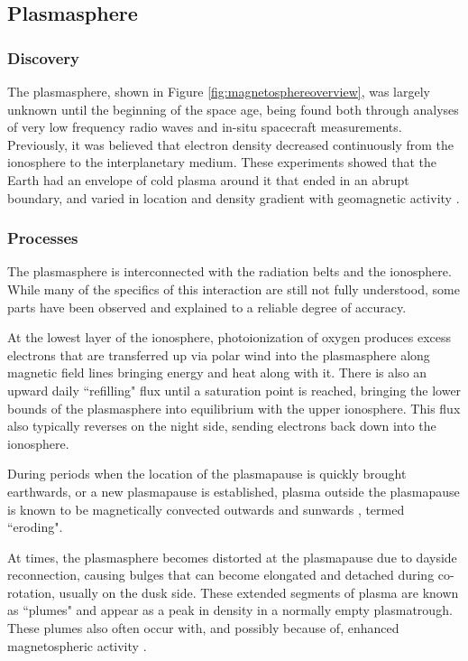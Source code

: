 \subsection{Plasmasphere}

\subsubsection{Discovery}
The plasmasphere, shown in Figure \ref{fig:magnetosphereoverview}, was largely unknown until the beginning of the space age, being found both through analyses of very low frequency radio waves and in-situ spacecraft measurements. Previously, it was believed that electron density decreased continuously from the ionosphere to the interplanetary medium. These experiments showed that the Earth had an envelope of cold plasma around it that ended in an abrupt boundary, and varied in location and density gradient with geomagnetic activity \citep{Carpenter1966WhistlerStudiesPlasmapause,EarthsPlasmasphere}.

\subsubsection{Processes}
The plasmasphere is interconnected with the radiation belts and the ionosphere. While many of the specifics of this interaction are still not fully understood, some parts have been observed and explained to a reliable degree of accuracy. 

At the lowest layer of the ionosphere, photoionization of oxygen produces excess electrons that are transferred up via polar wind into the plasmasphere along magnetic field lines bringing energy and heat along with it. There is also an upward daily ``refilling"  flux  until a saturation point is reached, bringing the lower bounds of the plasmasphere into equilibrium with the upper ionosphere. This flux also typically reverses on the night side, sending electrons back down into the ionosphere.

During periods when the location of the plasmapause is quickly brought earthwards, or a new plasmapause is established, plasma outside the plasmapause is known to be magnetically convected outwards and sunwards \citep{ErosionRecoveryPlasmasphere}, termed ``eroding".  

At times, the plasmasphere becomes distorted at the plasmapause due to dayside reconnection, causing bulges that can become elongated and detached during co-rotation, usually on the dusk side. These extended segments of plasma are known as ``plumes" and appear as a peak in density in a normally empty plasmatrough. These plumes also often occur with, and possibly because of, enhanced magnetospheric activity \citep{EvolutionPlasmasphericIons}.

